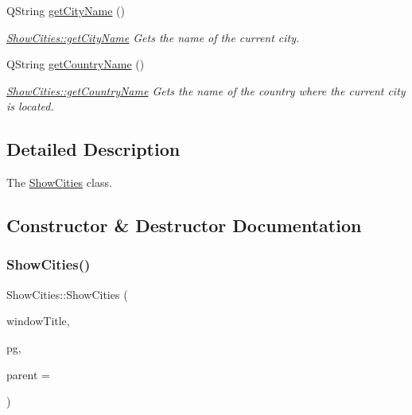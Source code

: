\begin{DoxyCompactItemize}
Q\+String \mbox{\hyperlink{class_show_cities_a3640b91c66939d0070c3dd6f5b9eb93c}{get\+City\+Name}} ()
\begin{DoxyCompactList}\small\item\em \mbox{\hyperlink{class_show_cities_a3640b91c66939d0070c3dd6f5b9eb93c}{Show\+Cities\+::get\+City\+Name}} Gets the name of the current city. \end{DoxyCompactList}\item 
Q\+String \mbox{\hyperlink{class_show_cities_a93cf32e7ef19a182d0022c9c888392aa}{get\+Country\+Name}} ()
\begin{DoxyCompactList}\small\item\em \mbox{\hyperlink{class_show_cities_a93cf32e7ef19a182d0022c9c888392aa}{Show\+Cities\+::get\+Country\+Name}} Gets the name of the country where the current city is located. \end{DoxyCompactList}\end{DoxyCompactItemize}


\subsection{Detailed Description}
The \mbox{\hyperlink{class_show_cities}{Show\+Cities}} class. 

\subsection{Constructor \& Destructor Documentation}
\mbox{\label{class_show_cities_a71a514390bebd22b5e6ecbb6b731979a}} 
\subsubsection{\texorpdfstring{ShowCities()}{ShowCities()}}
{\footnotesize\ttfamily Show\+Cities\+::\+Show\+Cities (\begin{DoxyParamCaption}\item[{Q\+String}]{window\+Title,  }\item[{\mbox{\hyperlink{classpsql}{psql}} $\ast$}]{pg,  }\item[{Q\+Widget $\ast$}]{parent = {} }\end{DoxyParamCaption})\hspace{0.3cm}{\ttfamily [explicit]}}



